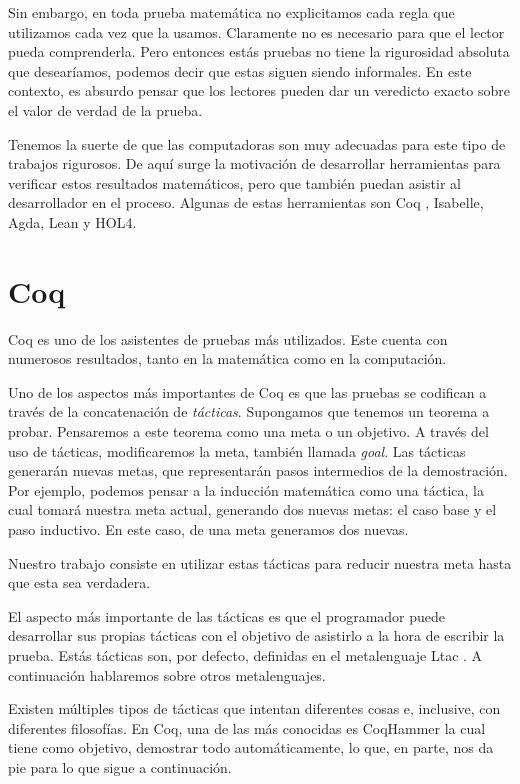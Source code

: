 Sin embargo, en toda prueba matemática no explicitamos cada regla que utilizamos cada vez que la usamos.
Claramente no es necesario para que el lector pueda comprenderla.
Pero entonces estás pruebas no tiene la rigurosidad absoluta que desearíamos, podemos decir que estas siguen siendo informales.
En este contexto, es absurdo pensar que los lectores pueden dar un veredicto exacto sobre el valor de verdad de la prueba.

Tenemos la suerte de que las computadoras son muy adecuadas para este tipo de trabajos rigurosos. De aquí surge la motivación de desarrollar herramientas para verificar estos resultados matemáticos, pero que también puedan asistir al desarrollador en el proceso. Algunas de estas herramientas son Coq \cite{CIC}, Isabelle, Agda, Lean y HOL4.

\section{Coq}

Coq es uno de los asistentes de pruebas más utilizados.
Este cuenta con numerosos resultados, tanto en la matemática como en la computación.

Uno de los aspectos más importantes de Coq es que las pruebas se codifican a través de la concatenación de \emph{tácticas}.
Supongamos que tenemos un teorema a probar.
Pensaremos a este teorema como una meta o un objetivo.
A través del uso de tácticas, modificaremos la meta, también llamada \emph{goal}.
Las tácticas generarán nuevas metas, que representarán pasos intermedios de la demostración.
Por ejemplo, podemos pensar a la inducción matemática como una táctica, la cual tomará nuestra meta actual, generando dos nuevas metas: el caso base y el paso inductivo. En este caso, de una meta generamos dos nuevas.

Nuestro trabajo consiste en utilizar estas tácticas para reducir nuestra meta hasta que esta sea verdadera.

El aspecto más importante de las tácticas es que el programador puede desarrollar sus propias tácticas con el objetivo de asistirlo a la hora de escribir la prueba.
Estás tácticas son, por defecto, definidas en el metalenguaje Ltac \cite{DBLP:conf/lpar/Delahaye00}. A continuación hablaremos sobre otros metalenguajes.

Existen múltiples tipos de tácticas que intentan diferentes cosas e, inclusive, con diferentes filosofías.
En Coq, una de las más conocidas es CoqHammer \cite{DBLP:journals/jar/CzajkaK18} la cual tiene como objetivo, demostrar todo automáticamente, lo que, en parte, nos da pie para lo que sigue a continuación.

